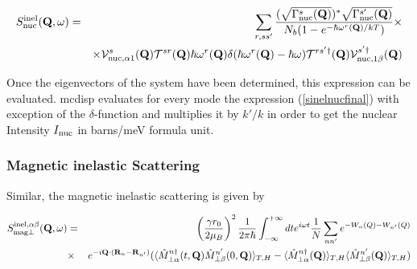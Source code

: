 \begin{eqnarray}\label{sinelnucfinal}
S_{\rm nuc}^{\rm inel}(\mathbf Q,\omega)&=&
\sum_{r,ss'}  
\frac{(\sqrt{\Gamma_{\rm nuc}^s(\mathbf Q)})^\ast\sqrt{\Gamma_{\rm nuc}^{s'}(\mathbf Q)}}
{N_b(1-e^{-\hbar{\omega^r}(\mathbf Q)/kT})} \times \\ \nonumber
&& \times \mathcal V^s_{{\rm nuc},\alpha1}(\mathbf Q)
{ \mathcal T^{sr}}(\mathbf Q)\hbar {\omega^r}(\mathbf Q)
 \delta(\hbar {\omega^r}(\mathbf Q) - 
\hbar \omega) {\mathcal T^{rs'\dag}}(\mathbf Q) 
\mathcal V^{s'\dag}_{{\rm nuc},1\beta}(\mathbf Q)
\end{eqnarray}

Once the eigenvectors  of the system have been determined, this expression can be 
 evaluated. {\prg mcdisp} evaluates for every mode the expression (\ref{sinelnucfinal}) with exception
of the $\delta$-function and multiplies it by $k'/k$ in order to get the nuclear Intensity $I_{\rm nuc}$ in
barns/meV formula unit.

\subsubsection{Magnetic inelastic Scattering}

Similar, the magnetic inelastic scattering is given by





\begin{eqnarray}\label{Sinelperp}
S_{\rm mag\perp}^{\rm inel,\alpha\beta}(\mathbf Q,\omega)&=&\left( \frac{ \gamma r_0}{2 \mu_B}  \right)^2
\frac{1}{2\pi\hbar}\int_{-\infty}^{+\infty}dt e^{i\omega t}
\frac{1}{N}\sum_{nn'} e^{-W_n(Q)- W_{n'}(Q)}\\
&\times&  e^{-i\mathbf Q \cdot (\mathbf R_n-\mathbf R_{n'})}   (\langle \hat M_{\perp\alpha}^{n \dag}(t,\mathbf Q)  \hat M_{\perp\beta}^{n'}(0,\mathbf Q) \rangle_{T,H}
- \langle \hat M^{n \dag}_{\perp\alpha}(\mathbf Q)\rangle_{T,H} \langle \hat M^{n'}_{\perp\beta}(\mathbf Q) \rangle_{T,H})\nonumber
\end{eqnarray}

